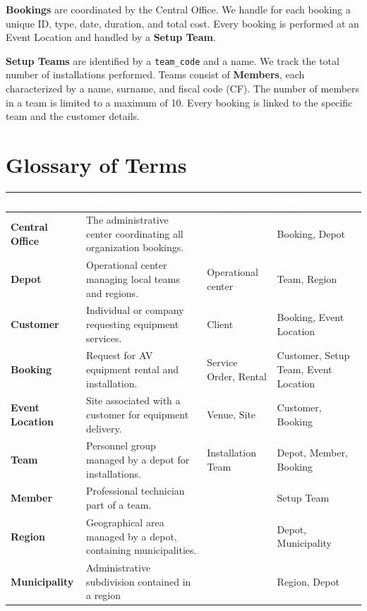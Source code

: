 \documentclass[12pt,a4paper]{article}
\begin{document}
\textbf{Bookings} are coordinated by the Central Office. We handle for each booking a unique ID, type, date, duration, and total cost. Every booking is performed at an Event Location and handled by a \textbf{Setup Team}.

\textbf{Setup Teams} are identified by a \texttt{team\_code} and a name. We track the total number of installations performed. Teams consist of \textbf{Members}, each characterized by a name, surname, and fiscal code (CF). The number of members in a team is limited to a maximum of 10. Every booking is linked to the specific team and the customer details.

\section{Glossary of Terms}

\begin{center}
\renewcommand{\arraystretch}{1.5}
\small
\begin{tabularx}{0.95\textwidth}{|P{0.16\textwidth}|Y|P{0.18\textwidth}|P{0.18\textwidth}|}
\hline
{}
\textcolor{white}{\textbf{Concept}} & \textcolor{white}{\textbf{Description}} & \textcolor{white}{\textbf{Synonym}} & \textcolor{white}{\textbf{Link}} \\ \hline
\textbf{Central Office} & The administrative center coordinating all organization bookings. &  & Booking, Depot \\ \hline
\textbf{Depot} & Operational center managing local teams and regions. & Operational center & Team, Region \\ \hline
\textbf{Customer} & Individual or company requesting equipment services. & Client & Booking, Event Location \\ \hline
\textbf{Booking} & Request for AV equipment rental and installation. & Service Order, Rental & Customer, Setup Team, Event Location \\ \hline
\textbf{Event Location} & Site associated with a customer for equipment delivery. & Venue, Site & Customer, Booking \\ \hline
\textbf{Team} & Personnel group managed by a depot for installations. & Installation Team & Depot, Member, Booking \\ \hline
\textbf{Member} & Professional technician part of a team. &  & Setup Team \\ \hline
\textbf{Region} & Geographical area managed by a depot, containing municipalities. &  & Depot, Municipality \\ \hline
\textbf{Municipality} & Administrative subdivision contained in a region & & Region, Depot \\ \hline
\end{tabularx}
\end{center}
\end{document}
